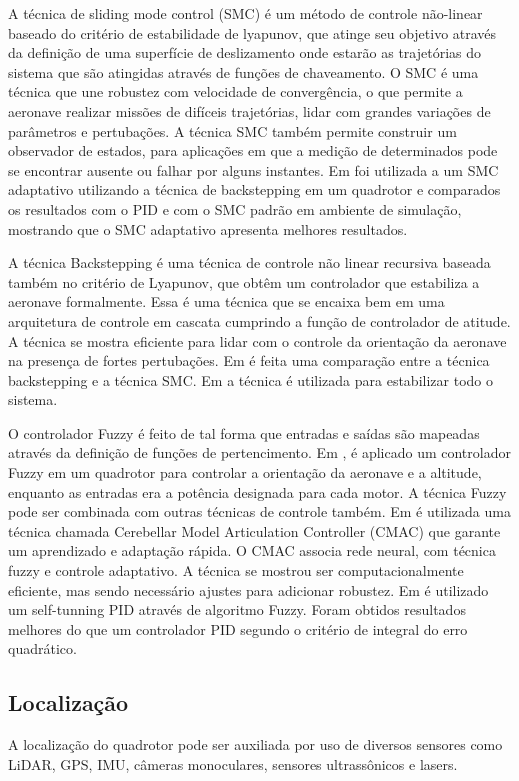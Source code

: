 A técnica de sliding mode control (SMC) é um método de controle não-linear baseado do critério de estabilidade de lyapunov, que atinge seu objetivo através da definição de uma superfície de deslizamento onde estarão as trajetórias do sistema que são atingidas através de funções de chaveamento. O SMC é uma técnica que une robustez com velocidade de convergência, o que permite a aeronave realizar missões de difíceis trajetórias, lidar com grandes variações de parâmetros e pertubações. A técnica SMC também permite construir um observador de estados, para aplicações em que a medição de determinados pode se encontrar ausente ou falhar por alguns instantes. Em \cite{Zhao2018a} foi utilizada a um SMC adaptativo utilizando a técnica de backstepping em um quadrotor e comparados os resultados com o PID e com o SMC padrão em ambiente de simulação, mostrando que o SMC adaptativo apresenta melhores resultados.

A técnica Backstepping é uma técnica de controle não linear recursiva baseada também no critério de Lyapunov, que obtêm um controlador que estabiliza a aeronave formalmente. Essa é uma técnica que se encaixa bem em uma arquitetura de controle em cascata cumprindo a função de controlador de atitude. A técnica se mostra eficiente para lidar com o controle da orientação da aeronave na presença de fortes pertubações. Em \cite{bouabdallah2005backstepping} é feita uma comparação entre a técnica backstepping e a técnica SMC. Em \cite{madani2006backstepping} a técnica é utilizada para estabilizar todo o sistema.

O controlador Fuzzy é feito de tal forma que entradas e saídas são mapeadas através da definição de funções de pertencimento. Em \cite{santos2010intelligent}, é aplicado um controlador Fuzzy em um quadrotor para controlar a orientação da aeronave e a altitude, enquanto as entradas era a potência designada para cada motor. A técnica Fuzzy pode ser combinada com outras técnicas de controle também. Em \cite{nicol2008robust} é utilizada uma técnica chamada Cerebellar Model Articulation Controller  (CMAC) que garante um aprendizado e adaptação rápida. O CMAC associa rede neural, com técnica fuzzy e controle adaptativo. A técnica se mostrou ser computacionalmente eficiente, mas sendo necessário ajustes para adicionar robustez. Em \cite{gautam2013control} é utilizado um self-tunning PID através de algoritmo Fuzzy. Foram obtidos resultados melhores do que um controlador PID segundo o critério de integral do erro quadrático.

\subsection{Localização}
A localização do quadrotor pode ser auxiliada por uso de diversos sensores como LiDAR, GPS, IMU, câmeras monoculares, sensores ultrassônicos e lasers.

